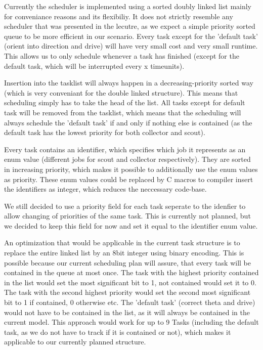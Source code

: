 \documentclass[12pt]{article}
\begin{document}
Currently the scheduler is implemented using a sorted doubly linked list mainly for conveniance reasons and its flexibiliy. It does not strictly resemble any scheduler that was presented in the lecutre, as we expect a simple priority sorted queue to be more efficient in our scenario. Every task except for the 'default task' (orient into direction and drive) will have very small cost and very small runtime. This allows us to only schedule whenever a task has finished (except for the default task, which will be interrupted every x timeunits).

Insertion into the tasklist will always happen in a decreasing-priority sorted way (which is very conveniant for the double linked structure). This means that scheduling simply has to take the head of the list. All tasks except for default task will be removed from the tasklist, which means that the scheduling will always schedule the 'default task' if and only if nothing else is contained (as the default task has the lowest priority for both collector and scout).

Every task contains an identifier, which specifies which job it represents as an enum value (different jobs for scout and collector respectively). They are sorted in increasing priority, which makes it possible to additionally use the enum values as priority. These enum values could be replaced by C macros to compiler insert the identifiers as integer, which reduces the neccessary code-base.

We still decided to use a priority field for each task seperate to the idenfier to allow changing of priorities of the same task. This is currently not planned, but we decided to keep this field for now and set it equal to the identifier enum value.

An optimization that would be applicable in the current task structure is to replace the entire linked list by an 8bit integer using binary encoding. This is possible because our current scheduling plan will assure, that every task will be contained in the queue at most once. The task with the highest priority contained in the list would set the most significant bit to 1, not contained would set it to 0. The task with the second highest priority would set the second most significant bit to 1 if contained, 0 otherwise etc. The 'default task' (correct theta and drive) would not have to be contained in the list, as it will always be contained in the current model. This approach would work for up to 9 Tasks (including the default task, as we do not have to track if it is contained or not), which makes it applicable to our currently planned structure.
\end{document}
